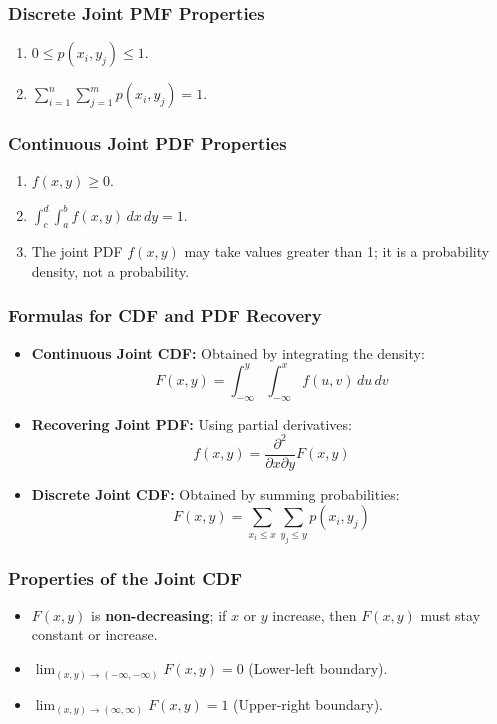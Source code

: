 \documentclass{article}
\begin{document}
\subsubsection*{Discrete Joint PMF Properties}
\begin{enumerate}
    \item $0 \le p(x_i, y_j) \le 1$.
    \item $\sum_{i=1}^{n}\sum_{j=1}^{m} p(x_i, y_j) = 1$.
\end{enumerate}

\subsubsection*{Continuous Joint PDF Properties}
\begin{enumerate}
    \item $f(x,y) \ge 0$.
    \item $\int_{c}^{d}\int_{a}^{b} f(x,y) \, dx \, dy = 1$.
    \item The joint PDF $f(x,y)$ may take values greater than 1; it is a probability density, not a probability.
\end{enumerate}

\subsubsection*{Formulas for CDF and PDF Recovery}
\begin{itemize}
    \item \textbf{Continuous Joint CDF:} Obtained by integrating the density:
    \[ F(x,y) = \int_{-\infty}^{y}\int_{-\infty}^{x} f(u,v) \, du \, dv \]
    \item \textbf{Recovering Joint PDF:} Using partial derivatives:
    \[ f(x,y) = \frac{\partial^2}{\partial x \partial y} F(x,y) \]
    \item \textbf{Discrete Joint CDF:} Obtained by summing probabilities:
    \[ F(x,y) = \sum_{x_i \le x}\sum_{y_j \le y} p(x_i, y_j) \]
\end{itemize}

\subsubsection*{Properties of the Joint CDF}
\begin{itemize}
    \item $F(x,y)$ is \textbf{non-decreasing}; if $x$ or $y$ increase, then $F(x,y)$ must stay constant or increase.
    \item $\lim_{(x,y)\rightarrow(-\infty,-\infty)} F(x,y) = 0$ (Lower-left boundary).
    \item $\lim_{(x,y)\rightarrow(\infty,\infty)} F(x,y) = 1$ (Upper-right boundary).
\end{itemize}
\end{document}
